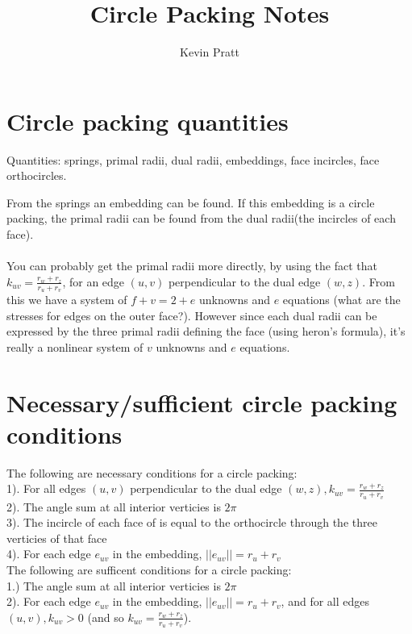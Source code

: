\documentclass{article}
\title{Circle Packing Notes}
\author{Kevin Pratt}
\begin{document}
\maketitle

\section{Circle packing quantities}

Quantities: springs, primal radii, dual radii, embeddings, face incircles, face orthocircles.

From the springs an embedding can be found. If this embedding is a circle packing, the primal radii can be found from the dual radii(the incircles of each face).

\paragraph{}
You can probably get the primal radii more directly, by using the fact that $k_{uv} = \frac{r_w+r_z}{r_u+r_v}$, for an edge $(u,v)$ perpendicular to the dual edge $(w,z)$. From this we have a system of $f+v=2+e$ unknowns and $e$ equations (what are the stresses for edges on the outer face?). However since each dual radii can be expressed by the three primal radii defining the face (using heron's formula), it's really a nonlinear system of $v$ unknowns and $e$ equations.

\section{Necessary/sufficient circle packing conditions}

The following are necessary conditions for a circle packing:\\
1). For all edges $(u,v)$ perpendicular to the dual edge $(w,z), k_{uv} = \frac{r_w+r_z}{r_u+r_v}$\\
2). The angle sum at all interior verticies is $2\pi$ \\
3). The incircle of each face of is equal to the orthocircle through the three verticies of that face\\
4). For each edge $e_{uv}$ in the embedding, $||e_{uv}||=r_u+r_v$\\

The following are sufficent conditions for a circle packing:\\
1.) The angle sum at all interior verticies is $2\pi$ \\
2). For each edge $e_{uv}$ in the embedding, $||e_{uv}||=r_u+r_v$, and for all edges 
$(u,v), k_{uv}>0$ (and so $k_{uv} = \frac{r_w+r_z}{r_u+r_v}$).\\
\end{document}

